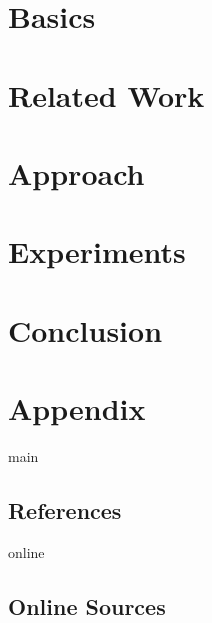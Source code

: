 \documentclass[11pt,a4paper]{report}
\begin{document}
    \chapter{Basics}
    \label{ch:2_basics}
    


    \chapter{Related Work}
    \label{ch:3_related_work}
    


    \chapter{Approach}
    \label{ch:4_approach}
    


    \chapter{Experiments}
    \label{ch:5_experiments}
    


    \chapter{Conclusion}
    \label{ch:6_conclusion}
    


    \chapter{Appendix}
    \label{ch:a_appendix}
    

    \newpage

    

    \begin{btSect}{main}
        \section*{References}
        \btPrintCited
    \end{btSect}

    \begin{btSect}{online}
        \section*{Online Sources}
        \btPrintCited
    \end{btSect}
\end{document}
